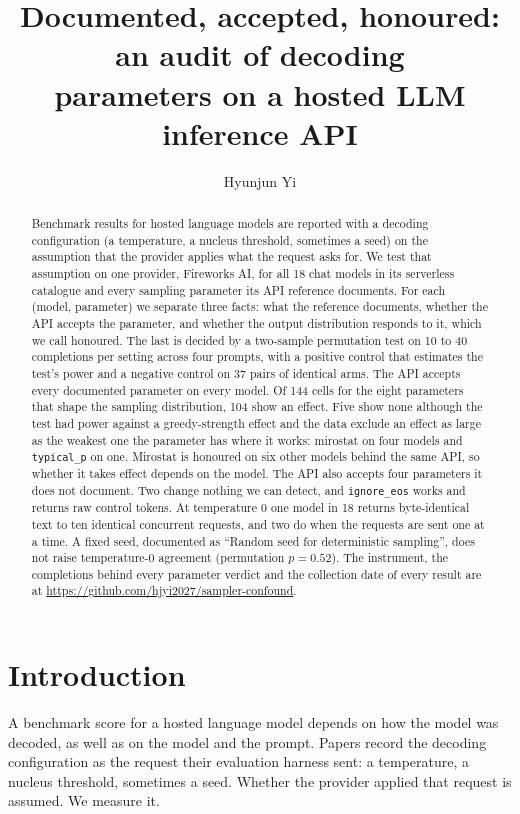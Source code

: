 \documentclass[10pt]{article}
\title{Documented, accepted, honoured: an audit of decoding\\
parameters on a hosted LLM inference API}
\author{\name Hyunjun Yi}
\newcommand{\p}[1]{\texttt{#1}}
\begin{document}
\maketitle

\begin{abstract}
Benchmark results for hosted language models are reported with a decoding configuration (a temperature, a nucleus threshold, sometimes a seed) on the assumption that the provider applies what the request asks for. We test that assumption on one provider, Fireworks AI, for all 18 chat models in its serverless catalogue and every sampling parameter its API reference documents. For each (model, parameter) we separate three facts: what the reference documents, whether the API accepts the parameter, and whether the output distribution responds to it, which we call honoured. The last is decided by a two-sample permutation test on 10 to 40 completions per setting across four prompts, with a positive control that estimates the test's power and a negative control on 37 pairs of identical arms. The API accepts every documented parameter on every model. Of 144 cells for the eight parameters that shape the sampling distribution, 104 show an effect. Five show none although the test had power against a greedy-strength effect and the data exclude an effect as large as the weakest one the parameter has where it works: mirostat on four models and \p{typical\_p} on one. Mirostat is honoured on six other models behind the same API, so whether it takes effect depends on the model. The API also accepts four parameters it does not document. Two change nothing we can detect, and \p{ignore\_eos} works and returns raw control tokens. At temperature 0 one model in 18 returns byte-identical text to ten identical concurrent requests, and two do when the requests are sent one at a time. A fixed seed, documented as ``Random seed for deterministic sampling'', does not raise temperature-0 agreement (permutation $p = 0.52$). The instrument, the completions behind every parameter verdict and the collection date of every result are at \url{https://github.com/hjyi2027/sampler-confound}.
\end{abstract}

\section{Introduction}

A benchmark score for a hosted language model depends on how the model was decoded, as well as on the model and the prompt. Papers record the decoding configuration as the request their evaluation harness sent: a temperature, a nucleus threshold, sometimes a seed. Whether the provider applied that request is assumed. We measure it.
\end{document}
